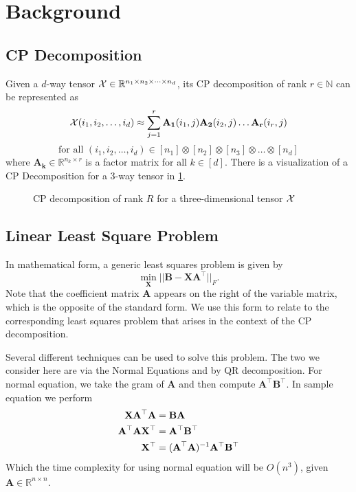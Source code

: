\documentclass{article}
\newcommand{\mat}[1]{\mathbf{#1}}
\newcommand{\M}[2][]{\bm{#1{\mathbf{\MakeUppercase{#2}}}}} 		%
\newcommand{\T}[2][]{#1{\mathbf{\cal{#2}}}} 						%
\begin{document}
\section{Background}
\subsection*{CP Decomposition}
Given a $d$-way tensor $\T{X} \in \mathbb{R}^{n_1\times n_2\times \dots \times n_d}$, its
CP decomposition of rank $r \in \mathbb{N}$ can be represented as 
$$\T{X}(i_1,i_2,\dots, i_d) \approx \sum^{r}_{j=1}\mat{A_1}(i_1,j)\mat{A_2}(i_2,j) \dots \mat{A_r}(i_r,j)$$
$$\text{for all } (i_1,i_2,\dots, i_d) \in [n_1] \otimes [n_2] \otimes [n_3] \otimes \dots \otimes [n_d]$$
where $\mat{A_k} \in \mathbb{R}^{n_k \times r}$ is a factor matrix for all $k \in [d]$. 
There is a visualization of a CP Decomposition for a 3-way tensor in \cref{fig:3d-cp-decomp}.

\begin{figure}[ht!]
\centering

\caption{CP decomposition of rank $R$ for a three-dimensional tensor $\T{X}$ \label{fig:3d-cp-decomp}}
\end{figure}

\subsection*{Linear Least Square Problem}
In mathematical form, a generic least squares problem is given by 
$$\min_{\mat{X}}||\mat{B} - \mat{X}\mat{A}^\top||_{F}.$$
Note that the coefficient matrix $\mat{A}$ appears on the right of the variable matrix, which is the opposite of the standard form.
We use this form to relate to the corresponding least squares problem that arises in the context of the CP decomposition.

Several different techniques can be used to solve this problem.
The two we consider here are via the Normal Equations and by QR decomposition.
For normal equation, we take the gram of $\mat{A}$ and then compute $\mat{A}^\top\mat{B}^\top$. In sample equation we perform
\begin{align}
\mat{X}\mat{A}^\top\mat{A} &= \mat{B}\mat{A} \nonumber \\
\mat{A}^\top\mat{A}\mat{X}^\top &= \mat{A}^\top\mat{B}^\top \nonumber \\
\mat{X}^\top &= (\M{A}^\top\mat{A})^{-1}\mat{A}^\top\mat{B}^\top \nonumber
\end{align}
Which the time complexity for using normal equation will be $O(n^3)$, given $\mat{A} \in \mathbb{R}^{n \times n}$.
\end{document}

